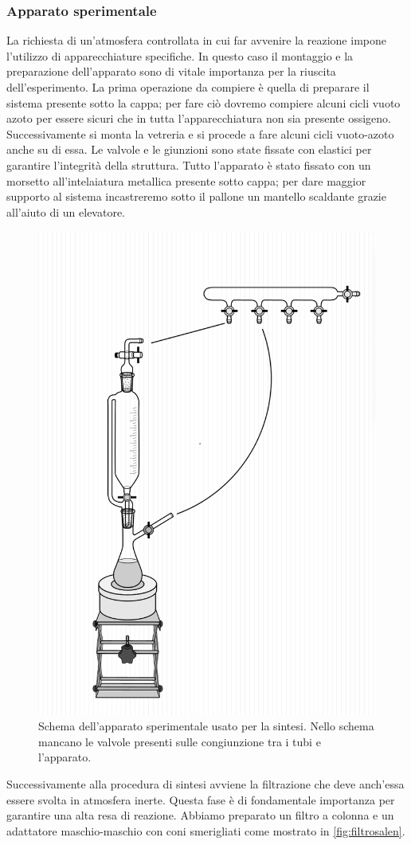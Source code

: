 \subsubsection{Apparato sperimentale}
\label{sec:cosalenapp}
La richiesta di un'atmosfera controllata in cui far avvenire la reazione impone l'utilizzo di apparecchiature specifiche. In questo caso il montaggio e la preparazione dell'apparato sono di vitale importanza per la riuscita dell'esperimento. La prima operazione da compiere è quella di preparare il sistema presente sotto la cappa; per fare ciò dovremo compiere alcuni cicli vuoto azoto per essere sicuri che in tutta l'apparecchiatura non sia presente ossigeno. Successivamente si monta la vetreria e si procede a fare alcuni cicli vuoto-azoto anche su di essa. Le valvole e le giunzioni sono state fissate con elastici per garantire l'integrità della struttura. Tutto l'apparato è stato fissato con un morsetto all'intelaiatura metallica presente sotto cappa; per dare maggior supporto al sistema incastreremo sotto il pallone un mantello scaldante grazie all'aiuto di un elevatore.
\begin{figure}[h!]
    \centering
    \includegraphics[width=0.4\linewidth]{foto/apparatosalen.png}
    \caption{Schema dell'apparato sperimentale usato per la sintesi. Nello schema mancano le valvole presenti sulle congiunzione tra i tubi e l'apparato. }
    \label{fig:my_label}
\end{figure}
Successivamente alla procedura di sintesi avviene la filtrazione che deve anch'essa essere svolta in atmosfera inerte. Questa fase è di fondamentale importanza per garantire una alta resa di reazione. Abbiamo preparato un filtro a colonna e un adattatore maschio-maschio con coni smerigliati come mostrato in \autoref{fig:filtrosalen}. 
